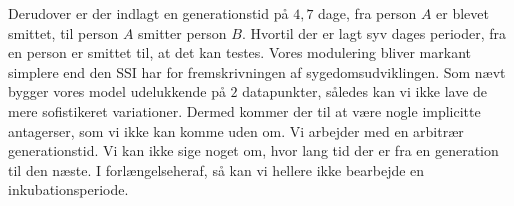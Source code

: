 Derudover er der indlagt en generationstid på $4,7$ dage, fra person $A$ er blevet smittet, til person $A$ smitter person $B$. Hvortil der er lagt syv dages perioder, fra en person er smittet til, at det kan testes.
Vores modulering bliver markant simplere end den SSI har for fremskrivningen af sygedomsudviklingen.
Som nævt bygger vores model udelukkende på $2$ datapunkter, således kan vi ikke lave de mere sofistikeret variationer. 
Dermed kommer der til at være nogle implicitte antagerser, som vi ikke kan komme uden om.
Vi arbejder med en arbitrær generationstid. Vi kan ikke sige noget om, hvor lang tid der er fra en generation til den næste. I forlængelseheraf, så kan vi hellere ikke bearbejde en inkubationsperiode. 

